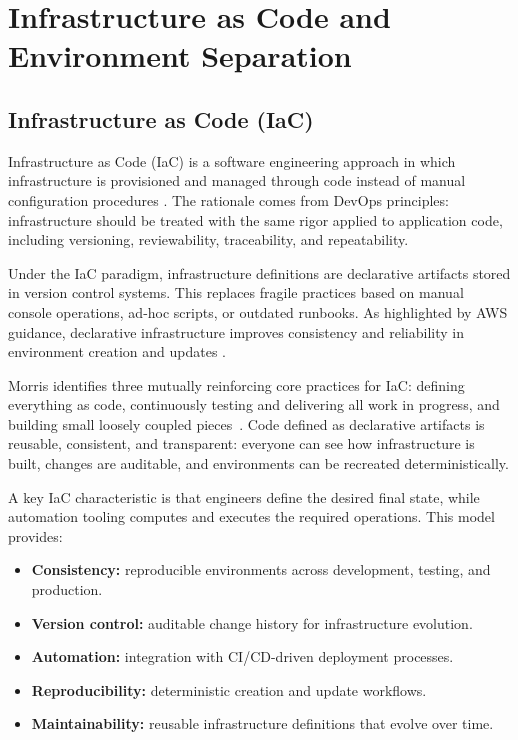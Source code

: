 \section{Infrastructure as Code and Environment Separation}
\subsection{Infrastructure as Code (IaC)}
Infrastructure as Code (IaC) is a software engineering approach in which infrastructure is provisioned and managed through code instead of manual configuration procedures \cite{awsIacWhitepaper}. The rationale comes from DevOps principles: infrastructure should be treated with the same rigor applied to application code, including versioning, reviewability, traceability, and repeatability.

Under the IaC paradigm, infrastructure definitions are declarative artifacts stored in version control systems. This replaces fragile practices based on manual console operations, ad-hoc scripts, or outdated runbooks. As highlighted by AWS guidance, declarative infrastructure improves consistency and reliability in environment creation and updates \cite{awsIacWhitepaper}.

Morris identifies three mutually reinforcing core practices for IaC: defining everything as code, continuously testing and delivering all work in progress, and building small loosely coupled pieces~\cite{morris2021iac}. Code defined as declarative artifacts is reusable, consistent, and transparent: everyone can see how infrastructure is built, changes are auditable, and environments can be recreated deterministically.

A key IaC characteristic is that engineers define the desired final state, while automation tooling computes and executes the required operations. This model provides:
\begin{itemize}
    \item \textbf{Consistency:} reproducible environments across development, testing, and production.
    \item \textbf{Version control:} auditable change history for infrastructure evolution.
    \item \textbf{Automation:} integration with CI/CD-driven deployment processes.
    \item \textbf{Reproducibility:} deterministic creation and update workflows.
    \item \textbf{Maintainability:} reusable infrastructure definitions that evolve over time.
\end{itemize}

